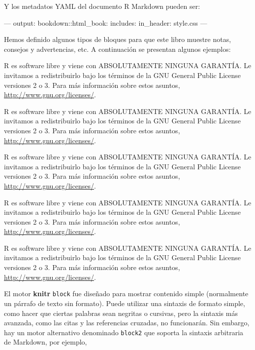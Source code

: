 \documentclass[12pt,]{krantz}
\makeatletter
\newenvironment{Shaded}{\begin{snugshade}}{\end{snugshade}}
\newcommand{\OtherTok}[1]{\textcolor[rgb]{0.56,0.35,0.01}{{#1}}}
\newcommand{\FunctionTok}[1]{\textcolor[rgb]{0.00,0.00,0.00}{{#1}}}
\newcommand{\NormalTok}[1]{{#1}}
\newenvironment{kframe}{%
\medskip{}
\setlength{\fboxsep}{.8em}
 \def\at@end@of@kframe{}%
 \ifinner\ifhmode%
  \def\at@end@of@kframe{\end{minipage}}%
  \begin{minipage}{\columnwidth}%
 \fi\fi%
 \def\FrameCommand##1{\hskip\@totalleftmargin \hskip-\fboxsep
 \colorbox{shadecolor}{##1}\hskip-\fboxsep
     \hskip-\linewidth \hskip-\@totalleftmargin \hskip\columnwidth}%
 \MakeFramed {\advance\hsize-\width
   \@totalleftmargin\z@ \linewidth\hsize
   \@setminipage}}%
 {\par\unskip\endMakeFramed%
 \at@end@of@kframe}
\renewenvironment{Shaded}{\begin{kframe}}{\end{kframe}}
\theoremstyle{definition}
\theoremstyle{definition}
\theoremstyle{remark}
\let\BeginKnitrBlock\begin \let\EndKnitrBlock\end
\makeatother
\begin{document}
Y los metadatos YAML del documento R Markdown pueden ser:

\begin{Shaded}
\begin{Highlighting}[]
\OtherTok{---}
\FunctionTok{output:}
  \FunctionTok{bookdown:}\NormalTok{:html_book:}
    \FunctionTok{includes:}
      \FunctionTok{in_header:} \NormalTok{style.css}
\OtherTok{---}
\end{Highlighting}
\end{Shaded}

Hemos definido algunos tipos de bloques para que este libro muestre
notas, consejos y advertencias, etc. A continuación se presentan algunos
ejemplos:

\BeginKnitrBlock{rmdnote}
R es software libre y viene con ABSOLUTAMENTE NINGUNA GARANTÍA. Le
invitamos a redistribuirlo bajo los términos de la GNU General Public
License versiones 2 o 3. Para más información sobre estos asuntos,
\url{http://www.gnu.org/licenses/}.
\EndKnitrBlock{rmdnote}

\BeginKnitrBlock{rmdcaution}
R es software libre y viene con ABSOLUTAMENTE NINGUNA GARANTÍA. Le
invitamos a redistribuirlo bajo los términos de la GNU General Public
License versiones 2 o 3. Para más información sobre estos asuntos,
\url{http://www.gnu.org/licenses/}.
\EndKnitrBlock{rmdcaution}

\BeginKnitrBlock{rmdimportant}
R es software libre y viene con ABSOLUTAMENTE NINGUNA GARANTÍA. Le
invitamos a redistribuirlo bajo los términos de la GNU General Public
License versiones 2 o 3. Para más información sobre estos asuntos,
\url{http://www.gnu.org/licenses/}.
\EndKnitrBlock{rmdimportant}

\BeginKnitrBlock{rmdtip}
R es software libre y viene con ABSOLUTAMENTE NINGUNA GARANTÍA. Le
invitamos a redistribuirlo bajo los términos de la GNU General Public
License versiones 2 o 3. Para más información sobre estos asuntos,
\url{http://www.gnu.org/licenses/}.
\EndKnitrBlock{rmdtip}

\BeginKnitrBlock{rmdwarning}
R es software libre y viene con ABSOLUTAMENTE NINGUNA GARANTÍA. Le
invitamos a redistribuirlo bajo los términos de la GNU General Public
License versiones 2 o 3. Para más información sobre estos asuntos,
\url{http://www.gnu.org/licenses/}.
\EndKnitrBlock{rmdwarning}

El motor \textbf{knitr} \texttt{block} fue diseñado para mostrar
contenido simple (normalmente un párrafo de texto sin formato). Puede
utilizar una sintaxis de formato simple, como hacer que ciertas palabras
sean negritas o cursivas, pero la sintaxis más avanzada, como las citas
y las referencias cruzadas, no funcionarán. Sin embargo, hay un motor
alternativo denominado \texttt{block2} que soporta la sintaxis
arbitraria de Markdown, por ejemplo,
\end{document}
